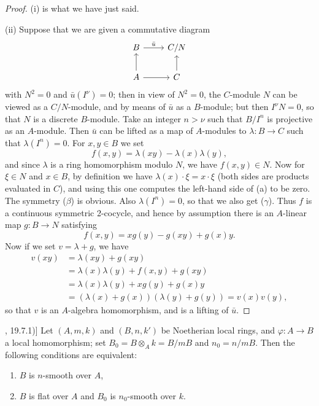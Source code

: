 \begin{proof}
(i) is what we have just said.

(ii) Suppose that we are given a commutative diagram
\[
\begin{tikzcd}
B \arrow[r, "\bar{u}"] & C/N \\
A \arrow[u] \arrow[r] & C \arrow[u]
\end{tikzcd}
\]
with $N^2 = 0$ and $\bar{u}(I^\nu) = 0$; then in view of $N^2 = 0$, the $C$-module $N$ can be
viewed as a $C/N$-module, and by means of $\bar{u}$ as a $B$-module; but then
$I^\nu N = 0$, so that $N$ is a discrete $B$-module. Take an integer $n > \nu$ such that
$B/I^n$ is projective as an $A$-module. Then $\bar{u}$ can be lifted as a map of $A$-modules
to $\lambda\colon B \to C$ such that $\lambda(I^n) = 0$. For $x, y \in B$ we set
\[
  f(x, y) = \lambda(xy) - \lambda(x)\lambda(y),
\]
and since $\lambda$ is a ring homomorphism modulo $N$, we have $f(x, y) \in N$. Now for
$\xi \in N$ and $x \in B$, by definition we have $\lambda(x) \cdot \xi = x \cdot \xi$ (both sides are
products evaluated in $C$), and using this one computes the left-hand side of (a) to
be zero. The symmetry ($\beta$) is obvious. Also $\lambda(I^n) = 0$, so that we also get
($\gamma$). Thus $f$ is a continuous symmetric 2-cocycle, and hence by assumption
there is an $A$-linear map $g\colon B \to N$ satisfying
\[
  f(x, y) = xg(y) - g(xy) + g(x)y.
\]
Now if we set $v = \lambda + g$, we have
\begin{align*}
  v(xy) &= \lambda(xy) + g(xy) \\
        &= \lambda(x)\lambda(y) + f(x, y) + g(xy) \\
        &= \lambda(x)\lambda(y) + xg(y) + g(x)y \\
        &= (\lambda(x) + g(x))(\lambda(y) + g(y)) = v(x)v(y),
\end{align*}
so that $v$ is an $A$-algebra homomorphism, and is a lifting of $\bar{u}$.
\end{proof}

\begin{theorem}[([G1], 19.7.1)]\label{thm:28.9}
Let $(A, m, k)$ and $(B, n, k')$ be Noetherian local rings, and $\varphi\colon A \to B$ a
local homomorphism; set $B_0 = B \otimes_A k = B/mB$ and $n_0 = n/mB$. Then the
following conditions are equivalent:
\begin{enumerate}[(1)]
  \item $B$ is $n$-smooth over $A$,
  \item $B$ is flat over $A$ and $B_0$ is $n_0$-smooth over $k$.
\end{enumerate}
\end{theorem}

